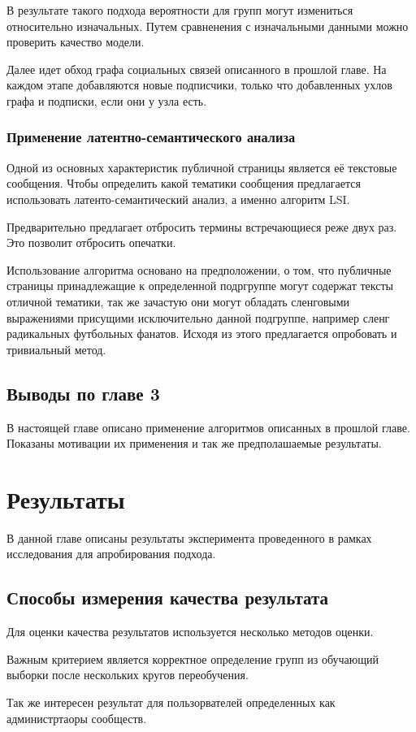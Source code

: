 \documentclass[annotation,times,page4]{itmo-student-thesis}
\begin{document}
В результате такого подхода вероятности для групп могут измениться относительно изначальных. Путем сравненения с изначальными данными можно проверить качество модели.

Далее идет обход графа социальных связей описанного в прошлой главе. На каждом этапе добавляются новые подписчики, только что добавленных ухлов графа и подписки, если они у узла есть.

\subsection{Применение латентно-семантического анализа}
Одной из основных характеристик публичной страницы является её текстовые сообщения. Чтобы определить какой тематики сообщения предлагается использовать латенто-семантический анализ, а именно алгоритм LSI.

Предварительно предлагает отбросить термины встречающиеся реже двух раз. Это позволит отбросить опечатки. 

Использование алгоритма основано на предположении, о том, что публичные страницы принадлежащие к определенной подргруппе могут содержат тексты отличной тематики, так же зачастую они могут обладать сленговыми выражениями присущими исключительно данной подгруппе, например сленг радикальных футбольных фанатов. Исходя из этого предлагается опробовать и тривиальный метод.
 
\section{Выводы по главе 3}
В настоящей главе описано применение алгоритмов описанных в прошлой главе. Показаны мотивации их применения и так же предполашаемые результаты.
\chapter{Результаты}
В данной главе описаны результаты эксперимента проведенного в рамках исследования для апробирования подхода.
\section{Способы измерения качества результата}
Для оценки качества результатов используется несколько методов оценки.

Важным критерием является корректное определение групп из обучающий выборки после нескольких кругов переобучения. 

Так же интересен результат для пользорвателей определенных как администртаоры сообществ.
\end{document}
